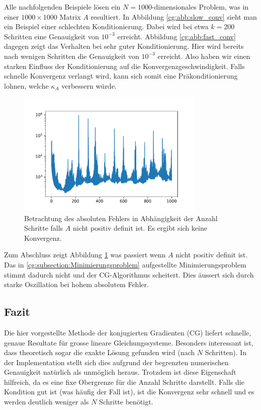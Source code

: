 Alle nachfolgenden Beispiele lösen ein $N=1000$-dimensionales Problem, was in einer $1000 \times 1000$ Matrix $A$ resultiert.
In Abbildung \ref{cg:abb:slow_conv} sieht man ein Beispiel einer schlechten Konditionierung.
Dabei wird bei etwa $k=200$ Schritten eine Genauigkeit von $10^{-3}$ erreicht.
Abbildung \ref{cg:abb:fast_conv} dagegen zeigt das Verhalten bei sehr guter Konditionierung.
Hier wird bereits nach wenigen Schritten die Genauigkeit von $10^{-3}$ erreicht.
Also haben wir einen starken Einfluss der Konditionierung auf die Konvergenzgeschwindigkeit.
Falls schnelle Konvergenz verlangt wird, kann sich somit eine Präkonditionierung lohnen, welche $\kappa_A$ verbessern würde.
\begin{figure}	
\centering
\includegraphics[width=0.8\textwidth]{papers/cg/images/no_convergence}
\caption{Betrachtung des absoluten Fehlers in Abhängigkeit der
Anzahl Schritte falls $A$ nicht positiv definit ist.
Es ergibt sich keine Konvergenz.}
\label{cg:abb:no_conv}
\end{figure}

Zum Abschluss zeigt Abbildung \ref{cg:abb:no_conv} was passiert wenn $A$ nicht positiv definit ist.
Das in \ref{cg:subsection:Minimierungsproblem} aufgestellte Minimierungsproblem stimmt dadurch nicht und der CG-Algorithmus scheitert.
Dies äussert sich durch starke Oszillation bei hohem absolutem Fehler.

\subsection{Fazit}
Die hier vorgestellte Methode der konjugierten Gradienten (CG) liefert schnelle, genaue Resultate für grosse lineare Gleichungssysteme.
Besonders interessant ist, dass theoretisch sogar die exakte Lösung gefunden wird (nach $N$ Schritten).
In der Implementation stellt sich dies aufgrund der begrenzten numerischen Genauigkeit natürlich als unmöglich heraus.
Trotzdem ist diese Eigenschaft hilfreich, da es eine fixe Obergrenze für die Anzahl Schritte darstellt.
Falls die Kondition gut ist (was häufig der Fall ist), ist die Konvergenz sehr schnell und es werden deutlich weniger als $N$ Schritte benötigt.
